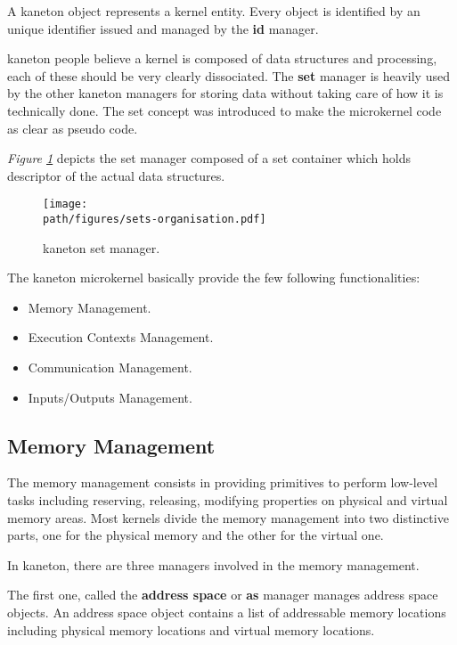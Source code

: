 A kaneton object represents a kernel entity. Every object is identified by
an unique identifier issued and managed by the \textbf{id} manager.

kaneton people believe a kernel is composed of data structures and processing,
each of these should be very clearly dissociated. The \textbf{set} manager is
heavily used by the other kaneton managers for storing data without taking
care of how it is technically done. The set concept was introduced to make
the microkernel code as clear as pseudo code.

\textit{Figure \ref{figure:sets-organisation}} depicts the set manager
composed of a set container which holds descriptor of the actual data
structures.

\begin{figure}[h]
  \begin{center}
    \texttt{[image: \\path/figures/sets-organisation.pdf]}
    \caption{kaneton set manager.}
    \label{figure:sets-organisation}
  \end{center}
\end{figure}

The kaneton microkernel basically provide the few following functionalities:

\begin{itemize}
  \item
    Memory Management.
  \item
    Execution Contexts Management.
  \item
    Communication Management.
  \item
    Inputs/Outputs Management.
\end{itemize}


\subsection*{Memory Management}

The memory management consists in providing primitives to perform low-level
tasks including reserving, releasing, modifying properties on physical and
virtual memory areas. Most kernels divide the memory management into two
distinctive parts, one for the physical memory and the other for the virtual
one.

In kaneton, there are three managers involved in the memory management.

The first one, called the \textbf{address space} or \textbf{as} manager
manages address space objects. An address space object contains a list of
addressable memory locations including physical memory locations and virtual
memory locations.

